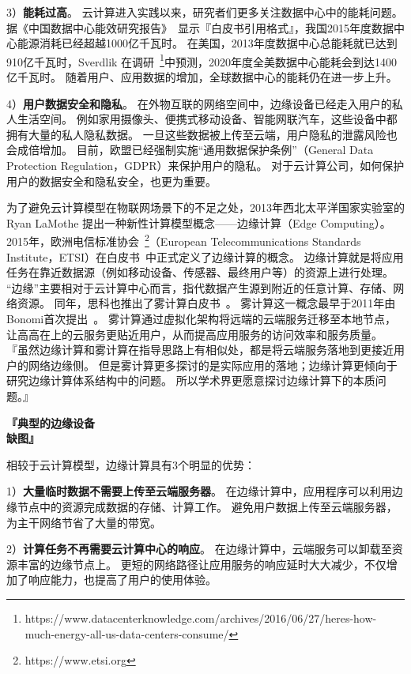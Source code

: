 3）\textbf{能耗过高}。
云计算进入实践以来，研究者们更多关注数据中心中的能耗问题。
据《中国数据中心能效研究报告》~\cite{whitebooks/cn15}显示『白皮书引用格式』，我国2015年度数据中心能源消耗已经超越1000亿千瓦时。
在美国，2013年度数据中心总能耗就已达到910亿千瓦时，Sverdlik 在调研~\footnote{https://www.datacenterknowledge.com/archives/2016/06/27/heres-how-much-energy-all-us-data-centers-consume/}中预测，2020年度全美数据中心能耗会到达1400亿千瓦时。
随着用户、应用数据的增加，全球数据中心的能耗仍在进一步上升。

4）\textbf{用户数据安全和隐私}。
在外物互联的网络空间中，边缘设备已经走入用户的私人生活空间。
例如家用摄像头、便携式移动设备、智能网联汽车，这些设备中都拥有大量的私人隐私数据。
一旦这些数据被上传至云端，用户隐私的泄露风险也会成倍增加。
目前，欧盟已经强制实施“通用数据保护条例”（General Data Protection Regulation，GDPR）来保护用户的隐私。
对于云计算公司，如何保护用户的数据安全和隐私安全，也更为重要。

为了避免云计算模型在物联网场景下的不足之处，2013年西北太平洋国家实验室的 Ryan LaMothe 提出一种新性计算模型概念——边缘计算（Edge Computing）。
2015年，欧洲电信标准协会~\footnote{https://www.etsi.org}（European Telecommunications Standards Institute，ETSI）在白皮书~\cite{hu2015mobile}中正式定义了边缘计算的概念。
边缘计算就是将应用任务在靠近数据源（例如移动设备、传感器、最终用户等）的资源上进行处理。
“边缘”主要相对于云计算中心而言，指代数据产生源到附近的任意计算、存储、网络资源。
同年，思科也推出了雾计算白皮书~\cite{computing2015internet}。
雾计算这一概念最早于2011年由Bonomi首次提出~\cite{bonomi2011connected}。
雾计算通过虚拟化架构将远端的云端服务迁移至本地节点，让高高在上的云服务更贴近用户，从而提高应用服务的访问效率和服务质量。
『虽然边缘计算和雾计算在指导思路上有相似处，都是将云端服务落地到更接近用户的网络边缘侧。
但是雾计算更多探讨的是实际应用的落地；边缘计算更倾向于研究边缘计算体系结构中的问题。
所以学术界更愿意探讨边缘计算下的本质问题。』

\textbf{『典型的边缘设备\\缺图』}

相较于云计算模型，边缘计算具有3个明显的优势：

1）\textbf{大量临时数据不需要上传至云端服务器}。
在边缘计算中，应用程序可以利用边缘节点中的资源完成数据的存储、计算工作。
避免用户数据上传至云端服务器，为主干网络节省了大量的带宽。

2）\textbf{计算任务不再需要云计算中心的响应}。
在边缘计算中，云端服务可以卸载至资源丰富的边缘节点上。
更短的网络路径让应用服务的响应延时大大减少，不仅增加了响应能力，也提高了用户的使用体验。

